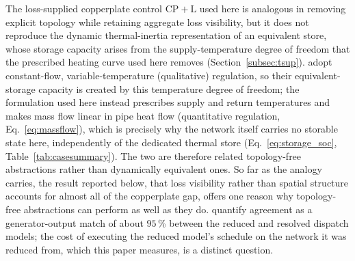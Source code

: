 \documentclass[a4paper,fleqn]{cas-sc}
\DeclareRobustCommand{\CPL}{\ensuremath{\mathrm{CP{+}L}}}
\begin{document}
The loss-supplied
copperplate control $\CPL$ used here is analogous in removing explicit topology while
retaining aggregate loss visibility, but it does not reproduce the dynamic thermal-inertia
representation of an equivalent store, whose storage capacity arises from the
supply-temperature degree of freedom that the prescribed heating curve used here removes
(Section~\ref{subsec:tsup}). \citet{Yang2024_equivalent} adopt constant-flow,
variable-temperature (qualitative) regulation, so their equivalent-storage capacity is
created by this temperature degree of freedom; the formulation used here instead prescribes
supply and return temperatures and makes mass flow linear in pipe heat flow (quantitative
regulation, Eq.~\eqref{eq:massflow}), which is precisely why the network itself carries no
storable state here, independently of the dedicated thermal store
(Eq.~\eqref{eq:storage_soc}, Table~\ref{tab:casesummary}).
The two are therefore related topology-free abstractions rather than dynamically equivalent
ones. So far as the analogy carries, the result reported below,
that loss visibility rather than spatial structure accounts for almost all of the copperplate
gap, offers one reason why topology-free abstractions can perform as well as they do.
\citet{Yang2024_equivalent} quantify agreement as a generator-output match of about
$95$\,\% between the reduced and resolved dispatch models; the cost of executing the
reduced model's schedule on the network it was reduced from, which this paper measures, is a
distinct question.
\end{document}
